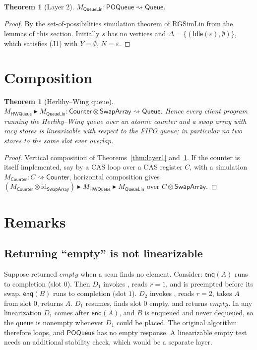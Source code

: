 \documentclass[11pt]{article}
\newtheorem{theorem}[lemma]{Theorem}
\theoremstyle{definition}
\theoremstyle{remark}
\newcommand{\Idle}{\mathsf{Idle}}
\newcommand{\Enq}{\mathsf{enq}}
\newcommand{\poss}{\Delta}
\newcommand{\code}[1]{\texttt{\detokenize{#1}}}
\newcommand{\Counter}{\mathsf{Counter}}
\newcommand{\SwapArray}{\mathsf{SwapArray}}
\newcommand{\POQueue}{\mathsf{POQueue}}
\newcommand{\Queue}{\mathsf{Queue}}
\newcommand{\HWQ}{\mathsf{HWQueue}}
\newcommand{\QLin}{\mathsf{QueueLin}}
\newcommand{\refines}{\rightsquigarrow}
\begin{document}
\begin{theorem}[Layer 2]\label{thm:layer2}
$M_{\QLin} : \POQueue \refines \Queue$.
\end{theorem}

\begin{proof}
By the set-of-possibilities simulation theorem of RGSimLin from the lemmas
of this section.  Initially $s$ has no vertices and $\poss = \{(\Idle(\varepsilon),
\emptyset)\}$, which satisfies (J1) with $Y = \emptyset$, $N = \varepsilon$.
\end{proof}

\section{Composition}

\begin{theorem}[Herlihy--Wing queue]
$M_{\HWQ} \blacktriangleright M_{\QLin} : \Counter \otimes \SwapArray
\refines \Queue$.  Hence every client program running the Herlihy--Wing
queue over an atomic counter and a swap array with racy stores is
linearizable with respect to the FIFO queue; in particular no two stores to
the same slot ever overlap.
\end{theorem}

\begin{proof}
Vertical composition of Theorems~\ref{thm:layer1} and~\ref{thm:layer2}.
If the counter is itself implemented, say by a CAS loop over a CAS register
$C$, with a simulation $M_{\Counter} : C \refines \Counter$, horizontal
composition gives $(M_{\Counter} \otimes \mathrm{id}_{\SwapArray})
\blacktriangleright M_{\HWQ} \blacktriangleright M_{\QLin}$ over
$C \otimes \SwapArray$.
\end{proof}

\section{Remarks}

\subsection{Returning ``empty'' is not linearizable}
\label{sec:empty}

Suppose \code{deq} returned $\mathit{empty}$ when a scan finds no element.
Consider: $\Enq(A)$ runs to completion (slot $0$).  Then $D_1$ invokes
\code{deq}, reads $r = 1$, and is preempted before its swap.  $\Enq(B)$
runs to completion (slot $1$).  $D_2$ invokes \code{deq}, reads $r = 2$,
takes $A$ from slot $0$, returns $A$.  $D_1$ resumes, finds slot $0$ empty,
and returns $\mathit{empty}$.  In any linearization $D_1$ comes after
$\Enq(A)$, and $B$ is enqueued and never dequeued, so the queue is nonempty
whenever $D_1$ could be placed.  The original algorithm therefore loops, and
$\POQueue$ has no empty response.  A linearizable empty test needs an
additional stability check, which would be a separate layer.
\end{document}

